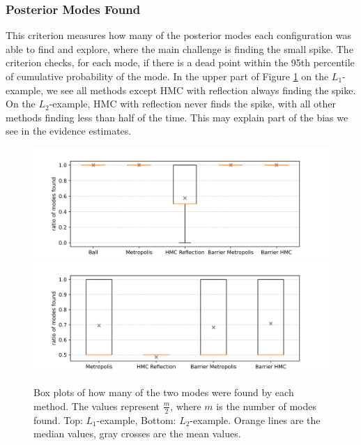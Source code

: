 \documentclass[12pt, a4paper]{report}
\begin{document}
\subsubsection{Posterior Modes Found}
This criterion measures how many of the posterior modes each configuration was able to find and explore, where the main challenge is finding the small spike.
The criterion checks, for each mode, if there is a dead point within the 95th percentile of cumulative probability of the mode.
In the upper part of Figure \ref{fig:results_modes_found} on the $L_1$-example, we see all methods except HMC with reflection always finding the spike.
On the $L_2$-example, HMC with reflection never finds the spike, with all other methods finding less than half of the time.
This may explain part of the bias we see in the evidence estimates.
\begin{figure}
    \centering
    \includegraphics[scale=0.4]{figs/results/modes_found_spike_20d.png}
    \includegraphics[scale=0.4]{figs/results/modes_found_spike_offcenter_20d.png}
    \caption{Box plots of how many of the two modes were found by each method. The values represent $\frac{m}{2}$, where $m$ is the number of modes found. Top: $L_1$-example, Bottom: $L_2$-example. Orange lines are the median values, gray crosses are the mean values.}
    \label{fig:results_modes_found}
\end{figure}
\end{document}
